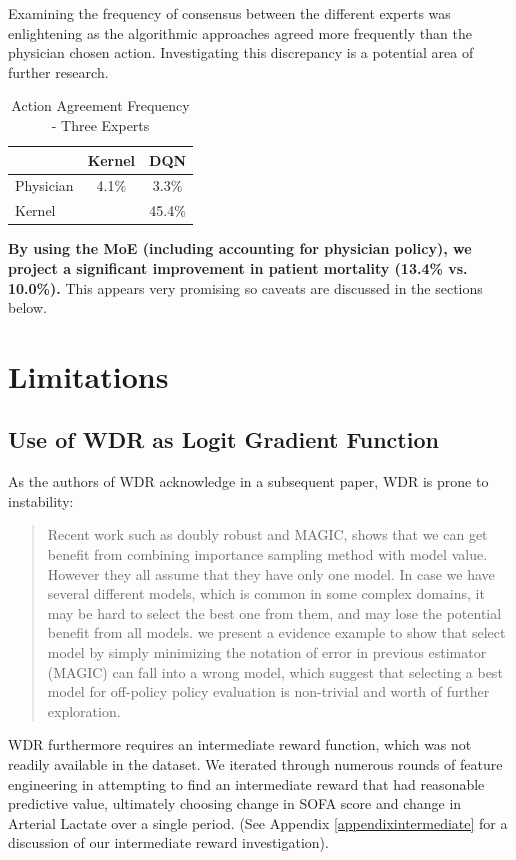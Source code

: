 \documentclass[letterpaper]{article}
\begin{document}
Examining the frequency of consensus between the different experts was enlightening as the
algorithmic approaches agreed more frequently than the physician chosen action. Investigating 
this discrepancy is a potential area of further research.

\begin{table}[H]
  \centering
  \caption{Action Agreement Frequency - Three Experts}

  \begin{tabular}{|l|c|c|}
    \hline
      & Kernel & DQN\\
     \hline
    Physician  & 4.1\% & 3.3\% \\
    \hline
    Kernel & & 45.4\% \\
    \hline
  \end{tabular}
\end{table}

\textbf{By using the MoE (including accounting for physician policy), we project a significant improvement in patient mortality (13.4\% vs. 10.0\%).} This appears very promising so caveats are discussed in the sections below.


\section{Limitations}

\subsection{Use of WDR as Logit Gradient Function}
As the authors of WDR acknowledge in a subsequent paper\cite{liumodel}, WDR is prone to instability:

\blockquote{
Recent work such as doubly robust and MAGIC, shows that we can get benefit from combining importance sampling method with model value.
However they all assume that they have only one model. In case we have several different models, which is common
in some complex domains, it may be hard to select the best one from them, and may lose the potential benefit from
all models. we present a evidence example to show that select model by simply minimizing the notation of error in
previous estimator (MAGIC) can fall into a wrong model, which suggest that selecting a best model for off-policy policy
evaluation is non-trivial and worth of further exploration. } 

WDR furthermore requires an intermediate reward function, which was not readily available in the 
dataset. We iterated through numerous rounds of feature engineering in attempting to 
find an intermediate reward that had reasonable predictive value, ultimately choosing change
in SOFA score and change in Arterial Lactate over a single period. 
(See Appendix \ref{appendixintermediate} for a discussion of our intermediate reward
investigation).
\end{document}
